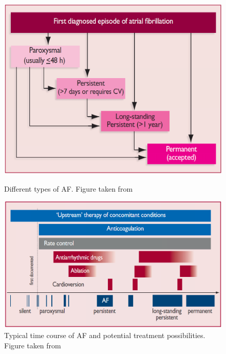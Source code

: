 \begin{figure}[H]
\begin{minipage}{0.5\textwidth}
\centering
    \includegraphics[width=\textwidth]{./teile/introduction/af_types.png}
    \caption{Different types of AF. Figure taken from \cite{ESC10}}
     \label{af_types}
\end{minipage}
\hfill
\begin{minipage}{0.52\textwidth}
\centering
  \includegraphics[width=\textwidth]{./teile/introduction/af_over_time.png}
  \caption{Typical time course of AF and potential treatment possibilities. Figure taken from \cite{ESC10}}
  \label{afovertime}
\end{minipage}
\end{figure}

